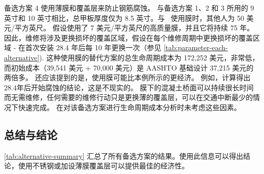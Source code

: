 备选方案 4 使用薄膜和覆盖层来防止钢筋腐蚀。 与备选方案 1、2 和 3 所用的 9 英寸和 10 英寸相比，总甲板厚度仅为 8.5 英寸。与 \ 使用膜时，其他人为 50 美元/平方英尺。 假设使用了 7 美元/平方英尺的高质量膜，并且它将持续 75 年。 因此，维修将涉及更换损坏的覆盖区域，假设在每个维修周期中更换损坏的覆盖区域 - 在首次安装 28.4 年后每 10 年更换一次（参见 \cref{tab:parameter-each-alternative}). 这种使用膜的替代方案的总生命周期成本为 172,252 美元，非常低，而初始成本（39,541 美元 + 70,000 美元）是 AASHTO 基础设计 37,215 美元的两倍多。 还应该提到的是，使用膜可能比本例所示的更经济。 例如，计算得出28.4年后开始腐蚀的结论，这是不现实的。 膜下的混凝土桥面可以持续很长时间而无需维修，任何需要的维修行动只是更换薄的覆盖层，可以在交通中断最少的情况下快速完成。 在对该备选方案进行生命周期成本分析时未考虑这些因素。

\subsection{总结与结论}
\cref{tab:alternative-summary} 汇总了所有备选方案的结果。使用此信息可以得出结论，使用不锈钢或加设薄膜覆盖层可以提供最佳的经济性。

